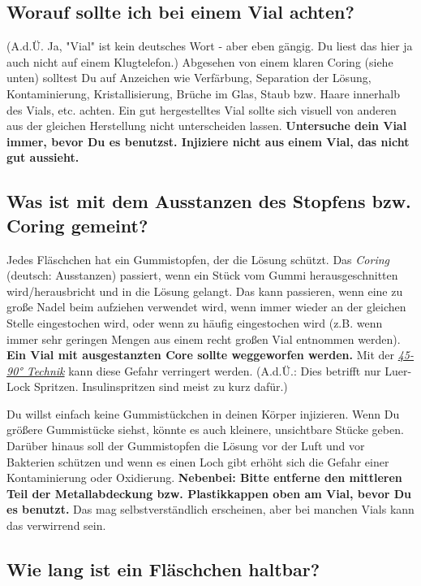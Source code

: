 \documentclass{article}
\begin{document}
{\subsection{Worauf sollte ich bei einem Vial achten?}

(A.d.Ü. Ja, "Vial" ist kein deutsches Wort - aber eben gängig. Du liest das hier ja auch nicht auf einem Klugtelefon.) Abgesehen von einem klaren Coring (siehe unten) solltest Du auf Anzeichen wie Verfärbung, Separation der Lösung, Kontaminierung, Kristallisierung, Brüche im Glas, Staub bzw. Haare innerhalb des Vials, etc. achten. Ein gut hergestelltes Vial sollte sich visuell von anderen aus der gleichen Herstellung nicht unterscheiden lassen. \textbf{Untersuche dein Vial immer, bevor Du es benutzst. Injiziere nicht aus einem Vial, das nicht gut aussieht.}

\subsection{Was ist mit dem Ausstanzen des Stopfens bzw. Coring gemeint?}\label{5-23}

Jedes Fläschchen hat ein Gummistopfen, der die Lösung schützt. Das \textit{Coring} (deutsch: Ausstanzen) passiert, wenn ein Stück vom Gummi herausgeschnitten wird/herausbricht und in die Lösung gelangt. Das kann passieren, wenn eine zu große Nadel beim aufziehen verwendet wird, wenn immer wieder an der gleichen Stelle eingestochen wird, oder wenn zu häufig eingestochen wird (z.B. wenn immer sehr geringen Mengen aus einem recht großen Vial entnommen werden). \textbf{Ein Vial mit ausgestanzten Core sollte weggeworfen werden. }Mit der \href{https://www.youtube.com/watch?v=w5F0SLoMjC8}{\textit{45-90° Technik}} kann diese Gefahr verringert werden. (A.d.Ü.: Dies betrifft nur Luer-Lock Spritzen. Insulinspritzen sind meist zu kurz dafür.)

Du willst einfach keine Gummistückchen in deinen Körper injizieren. Wenn Du größere Gummistücke siehst, könnte es auch kleinere, unsichtbare Stücke geben. Darüber hinaus soll der Gummistopfen die Lösung vor der Luft und vor Bakterien schützen und wenn es einen Loch gibt erhöht sich die Gefahr einer Kontaminierung oder Oxidierung. \textbf{Nebenbei: Bitte entferne den mittleren Teil der Metallabdeckung bzw. Plastikkappen oben am Vial, bevor Du es benutzt. }Das mag selbstverständlich erscheinen, aber bei manchen Vials kann das verwirrend sein. 

\subsection{Wie lang ist ein Fläschchen haltbar?}

}
\end{document}
